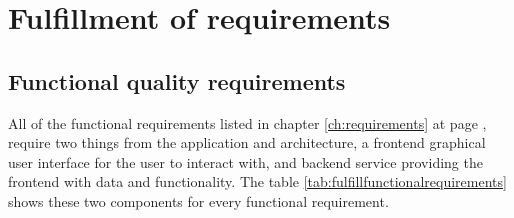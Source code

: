 \section{Fulfillment of requirements}\label{con_fullfill}

\subsection{Functional quality requirements}
All of the functional requirements listed in chapter \ref{ch:requirements} at page \pageref{ch:requirements}, require two things from the application and architecture, a frontend graphical user interface for the user to interact with, and backend service providing the frontend with data and functionality. The table \ref{tab:fulfillfunctionalrequirements} shows these two components for every functional requirement.
